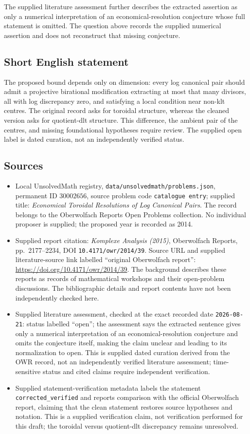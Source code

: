 \documentclass[11pt]{article}
\begin{document}
The supplied literature assessment further describes the extracted assertion as only a numerical interpretation of an economical-resolution conjecture whose full statement is omitted. The question above records the supplied numerical assertion and does not reconstruct that missing conjecture.
\subsection{Short English statement}
The proposed bound depends only on dimension: every log canonical pair should admit a projective birational modification extracting at most that many divisors, all with log discrepancy zero, and satisfying a local condition near non-klt centres. The original record asks for toroidal structure, whereas the cleaned version asks for quotient-dlt structure. This difference, the ambient pair of the centres, and missing foundational hypotheses require review. The supplied open label is dated curation, not an independently verified status.
\subsection{Sources}
\begin{itemize}
\item Local UnsolvedMath registry, \texttt{data/unsolvedmath/problems.json}, permanent ID \(30002656\), source problem code \texttt{catalogue entry}; supplied title: \emph{Economical Toroidal Resolutions of Log Canonical Pairs}. The record belongs to the Oberwolfach Reports Open Problems collection. No individual proposer is supplied; the proposed year is recorded as 2014.
\item Supplied report citation: \emph{Komplexe Analysis (2015)}, Oberwolfach Reports, pp.\ 2177--2234, DOI \texttt{10.4171/owr/2014/39}. Source URL and supplied literature-source link labelled ``original Oberwolfach report'': \url{https://doi.org/10.4171/owr/2014/39}. The background describes these reports as records of mathematical workshops and their open-problem discussions. The bibliographic details and report contents have not been independently checked here.
\item Supplied literature assessment, checked at the exact recorded date \texttt{2026-08-21}: status labelled ``open''; the assessment says the extracted sentence gives only a numerical interpretation of an economical-resolution conjecture and omits the conjecture itself, making the claim unclear and leading to its normalization to open. This is supplied dated curation derived from the OWR record, not an independently verified literature assessment; time-sensitive status and cited claims require independent verification.
\item Supplied statement-verification metadata labels the statement \texttt{corrected\_verified} and reports comparison with the official Oberwolfach report, claiming that the clean statement restores source hypotheses and notation. This is a supplied verification claim, not verification performed for this draft; the toroidal versus quotient-dlt discrepancy remains unresolved.
\end{itemize}
\end{document}
